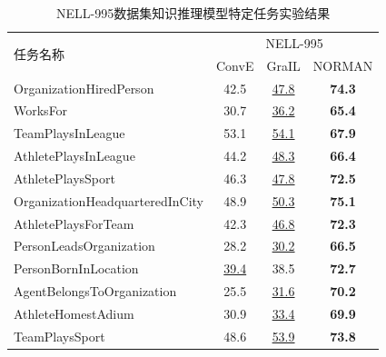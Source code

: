 \documentclass[algorithmlist, AutoFakeBold, AutoFakeSlant, figurelist, tablelist, nomlist, engineering]{seuthesix}
\begin{document}
\begin{table}[t]
  \centering
  \caption{NELL-995数据集知识推理模型特定任务实验结果}
  \begin{tabular*}{0.95\textwidth}{@{\extracolsep{\fill}}lccc}
    \toprule[1pt]
    \multirow{2}{*}{\small{任务名称}} & \multicolumn{3}{c}{\small{NELL-995}} \\
      & \small{ConvE} & \small{GraIL} & \small{NORMAN} \\ \hline
    \small{OrganizationHiredPerson} & 42.5 & \underline{47.8} & \textbf{74.3} \\
    \small{WorksFor} & 30.7 & \underline{36.2} & \textbf{65.4} \\
    \small{TeamPlaysInLeague} & 53.1 & \underline{54.1} & \textbf{67.9} \\
    \small{AthletePlaysInLeague} & 44.2 & \underline{48.3} & \textbf{66.4} \\
    \small{AthletePlaysSport} & 46.3 & \underline{47.8} & \textbf{72.5} \\
    \small{OrganizationHeadquarteredInCity} & 48.9 & \underline{50.3} & \textbf{75.1} \\
    \small{AthletePlaysForTeam} & 42.3 & \underline{46.8} & \textbf{72.3} \\
    \small{PersonLeadsOrganization} & 28.2 & \underline{30.2} & \textbf{66.5} \\
    \small{PersonBornInLocation} & \underline{39.4} & 38.5 & \textbf{72.7} \\
    \small{AgentBelongsToOrganization} & 25.5 & \underline{31.6} & \textbf{70.2} \\
    \small{AthleteHomestAdium} & 30.9 & \underline{33.4} & \textbf{69.9} \\
    \small{TeamPlaysSport} & 48.6 & \underline{53.9} & \textbf{73.8} \\
    \bottomrule[1pt]
  \end{tabular*}
  \label{Experiment1_tasks2}
\end{table}
\end{document}
